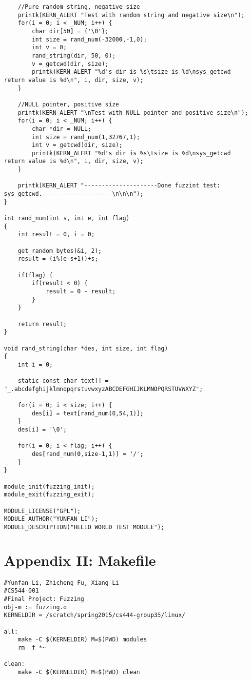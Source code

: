 \documentclass[twoside]{article}
\begin{document}
\begin{lstlisting}
	//Pure random string, negative size
	printk(KERN_ALERT "Test with random string and negative size\n");
	for(i = 0; i < _NUM; i++) {
		char dir[50] = {'\0'};
		int size = rand_num(-32000,-1,0);
		int v = 0;
		rand_string(dir, 50, 0);
		v = getcwd(dir, size);
		printk(KERN_ALERT "%d's dir is %s\tsize is %d\nsys_getcwd return value is %d\n", i, dir, size, v);
	}

	//NULL pointer, positive size
	printk(KERN_ALERT "\nTest with NULL pointer and positive size\n");
	for(i = 0; i < _NUM; i++) {
		char *dir = NULL;
		int size = rand_num(1,32767,1);
		int v = getcwd(dir, size);
		printk(KERN_ALERT "%d's dir is %s\tsize is %d\nsys_getcwd return value is %d\n", i, dir, size, v);
	}
	
	printk(KERN_ALERT "---------------------Done fuzzint test: sys_getcwd.--------------------\n\n\n");
}

int rand_num(int s, int e, int flag)
{
	int result = 0, i = 0;

	get_random_bytes(&i, 2);
	result = (i%(e-s+1))+s; 

	if(flag) {
		if(result < 0) {
			result = 0 - result;
		}
	}
	
	return result;
}

void rand_string(char *des, int size, int flag)
{
	int i = 0;
	
	static const char text[] = "_.abcdefghijklmnopqrstuvwxyzABCDEFGHIJKLMNOPQRSTUVWXYZ";

	for(i = 0; i < size; i++) {
		des[i] = text[rand_num(0,54,1)];
	}	
	des[i] = '\0';

	for(i = 0; i < flag; i++) {
		des[rand_num(0,size-1,1)] = '/';
	}
}

module_init(fuzzing_init);
module_exit(fuzzing_exit);

MODULE_LICENSE("GPL");
MODULE_AUTHOR("YUNFAN LI");
MODULE_DESCRIPTION("HELLO WORLD TEST MODULE");
\end{lstlisting}
\section*{Appendix II: Makefile}
\lstset{escapechar=@,style=custommake}
\begin{lstlisting}
#Yunfan Li, Zhicheng Fu, Xiang Li
#CS544-001
#Final Project: Fuzzing
obj-m := fuzzing.o
KERNELDIR = /scratch/spring2015/cs444-group35/linux/

all:
	make -C $(KERNELDIR) M=$(PWD) modules
	rm -f *~

clean:
	make -C $(KERNELDIR) M=$(PWD) clean
\end{lstlisting}
\end{document}
